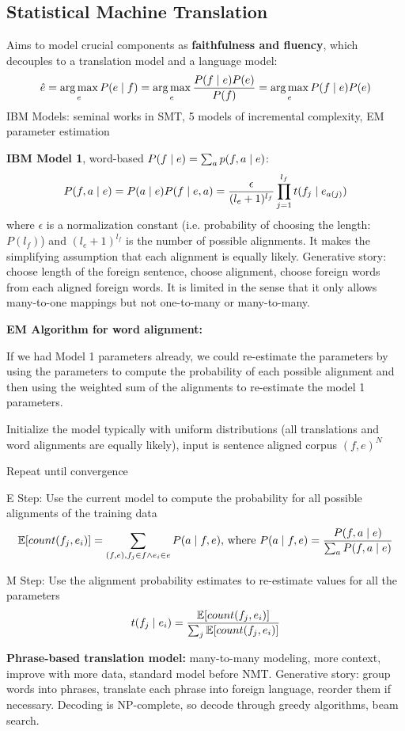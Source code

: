 \documentclass[12pt]{article}
\begin{document}
\subsection{Statistical Machine Translation}
Aims to model crucial components as \textbf{faithfulness and fluency}, which decouples to a translation model and a language model:
\[ \hat{e} = \operatorname*{arg\,max}_e P(e\mid f) = \operatorname*{arg\,max}_e \frac{P(f\mid e)P(e)}{P(f)} = \operatorname*{arg\,max}_e P(f\mid e)P(e) \]
IBM Models: seminal works in SMT, 5 models of incremental complexity, EM parameter estimation
\par \textbf{IBM Model 1}, word-based $P(f\mid e) = \sum_a p(f,a\mid e)$:
\[ P(f,a\mid e) = P(a\mid e) P(f\mid e,a) = \frac{\epsilon}{(l_e + 1)^{l_f}} \prod_{j=1}^{l_f} t(f_j \mid e_{a(j)}) \]
where $\epsilon$ is a normalization constant (i.e. probability of choosing the length: $P(l_f)$) and $(l_e + 1)^{l_f}$ is the number of possible alignments. It makes the simplifying assumption that each alignment is equally likely. Generative story: choose length of the foreign sentence, choose alignment, choose foreign words from each aligned foreign words. It is limited in the sense that it only allows many-to-one mappings but not one-to-many or many-to-many.
\par \textbf{EM Algorithm for word alignment:}
\par If we had Model 1 parameters already, we could re-estimate the parameters by using the parameters to compute the probability of each possible alignment and then using the weighted sum of the alignments to re-estimate the model 1 parameters.
\olb
\item Initialize the model typically with uniform distributions (all translations and word alignments are equally likely), input is sentence aligned corpus $(f,e)^N$
\item Repeat until convergence
\ulb
\item E Step: Use the current model to compute the probability for all possible alignments of the training data
\[ \operatorname{\mathbb{E}}[count(f_j, e_i)] = \sum_{(f,e),f_j \in f \wedge e_i \in e} P(a\mid f,e) \text{, where } P(a\mid f,e) = \frac{P(f,a \mid e)}{\sum_a P(f,a\mid e)} \]
\item M Step: Use the alignment probability estimates to re-estimate values for all the parameters
\[ t(f_j \mid e_i) = \frac{\operatorname{\mathbb{E}}[count(f_j, e_i)]}{\sum_j \operatorname{\mathbb{E}}[count(f_j, e_i)]} \]
\ule
\ole
\par \textbf{Phrase-based translation model:} many-to-many modeling, more context, improve with more data, standard model before NMT. Generative story: group words into phrases, translate each phrase into foreign language, reorder them if necessary. Decoding is NP-complete, so decode through greedy algorithms, beam search.
\end{document}
